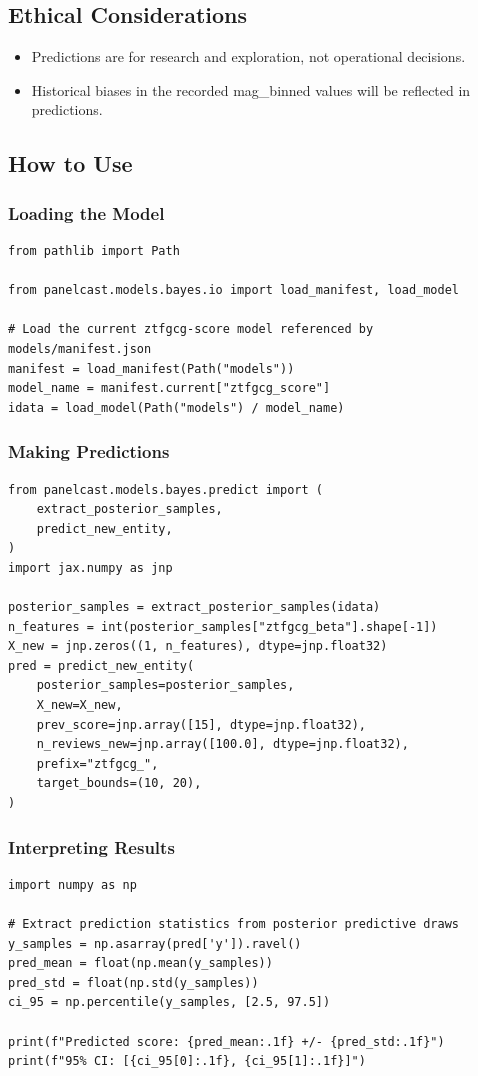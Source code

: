 \documentclass{article}
\begin{document}
\subsection*{Ethical Considerations}
\begin{itemize}
  \item Predictions are for research and exploration, not operational decisions.
  \item Historical biases in the recorded mag\_binned values will be reflected in predictions.
\end{itemize}

\subsection*{How to Use}

\subsubsection*{Loading the Model}
\begin{lstlisting}
from pathlib import Path

from panelcast.models.bayes.io import load_manifest, load_model

# Load the current ztfgcg-score model referenced by models/manifest.json
manifest = load_manifest(Path("models"))
model_name = manifest.current["ztfgcg_score"]
idata = load_model(Path("models") / model_name)
\end{lstlisting}

\subsubsection*{Making Predictions}
\begin{lstlisting}
from panelcast.models.bayes.predict import (
    extract_posterior_samples,
    predict_new_entity,
)
import jax.numpy as jnp

posterior_samples = extract_posterior_samples(idata)
n_features = int(posterior_samples["ztfgcg_beta"].shape[-1])
X_new = jnp.zeros((1, n_features), dtype=jnp.float32)
pred = predict_new_entity(
    posterior_samples=posterior_samples,
    X_new=X_new,
    prev_score=jnp.array([15], dtype=jnp.float32),
    n_reviews_new=jnp.array([100.0], dtype=jnp.float32),
    prefix="ztfgcg_",
    target_bounds=(10, 20),
)
\end{lstlisting}

\subsubsection*{Interpreting Results}
\begin{lstlisting}
import numpy as np

# Extract prediction statistics from posterior predictive draws
y_samples = np.asarray(pred['y']).ravel()
pred_mean = float(np.mean(y_samples))
pred_std = float(np.std(y_samples))
ci_95 = np.percentile(y_samples, [2.5, 97.5])

print(f"Predicted score: {pred_mean:.1f} +/- {pred_std:.1f}")
print(f"95% CI: [{ci_95[0]:.1f}, {ci_95[1]:.1f}]")
\end{lstlisting}
\end{document}
